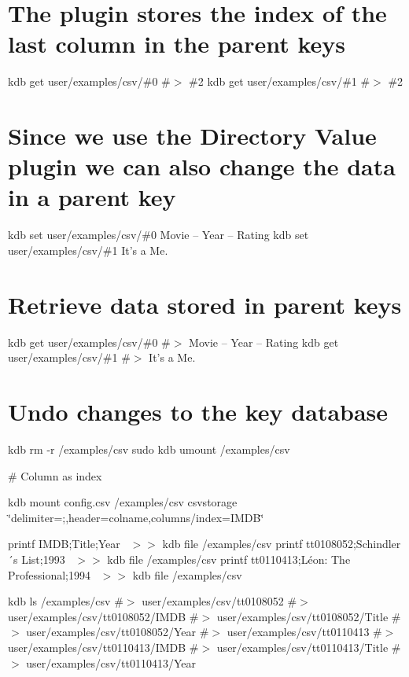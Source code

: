 \section*{The plugin stores the index of the last column in the parent keys}

kdb get user/examples/csv/\#0 \#$>$ \#2 kdb get user/examples/csv/\#1 \#$>$ \#2

\section*{Since we use the Directory Value plugin we can also change the data in a parent key}

kdb set user/examples/csv/\#0 \textquotesingle{}Movie – Year – Rating\textquotesingle{} kdb set user/examples/csv/\#1 \textquotesingle{}It’s a Me.\textquotesingle{}

\section*{Retrieve data stored in parent keys}

kdb get user/examples/csv/\#0 \#$>$ Movie – Year – Rating kdb get user/examples/csv/\#1 \#$>$ It’s a Me.

\section*{Undo changes to the key database}

kdb rm -\/r /examples/csv sudo kdb umount /examples/csv 
\begin{DoxyCode}
# Column as index
\end{DoxyCode}
 kdb mount config.\+csv /examples/csv csvstorage \char`\"{}delimiter=;,header=colname,columns/index=\+I\+M\+D\+B\char`\"{}

printf \textquotesingle{}I\+M\+DB;Title;Year~\newline
\textquotesingle{} $>$$>$ {\ttfamily kdb file /examples/csv} printf \textquotesingle{}tt0108052;Schindler´s List;1993~\newline
\textquotesingle{} $>$$>$ {\ttfamily kdb file /examples/csv} printf \textquotesingle{}tt0110413;Léon\+: The Professional;1994~\newline
\textquotesingle{} $>$$>$ {\ttfamily kdb file /examples/csv}

kdb ls /examples/csv \#$>$ user/examples/csv/tt0108052 \#$>$ user/examples/csv/tt0108052/\+I\+M\+DB \#$>$ user/examples/csv/tt0108052/\+Title \#$>$ user/examples/csv/tt0108052/\+Year \#$>$ user/examples/csv/tt0110413 \#$>$ user/examples/csv/tt0110413/\+I\+M\+DB \#$>$ user/examples/csv/tt0110413/\+Title \#$>$ user/examples/csv/tt0110413/\+Year

